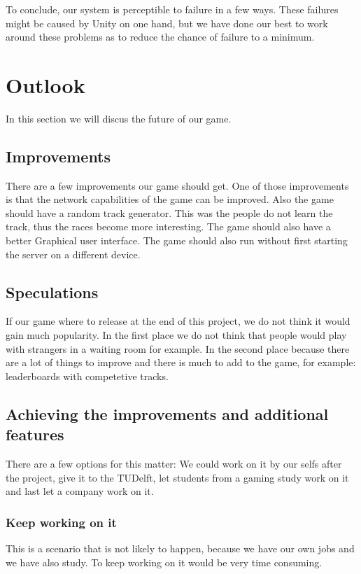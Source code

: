 \documentclass[11pt,twoside,a4paper]{article}
\begin{document}
\newline
\newline
To conclude, our system is perceptible to failure in a few ways. These failures might be caused by Unity on one hand, but we have done our best to work around these problems as to reduce the chance of failure to a minimum.

\newpage

\section{Outlook}
In this section we will discus the future of our game.

\subsection{Improvements}
There are a few improvements our game should get. One of those improvements is that the network capabilities of the game can be improved. Also the game should have a random track generator. This was the people do not learn the track, thus the races become more interesting. The game should also have a better Graphical user interface. The game should also run without first starting the server on a different device.

\subsection{Speculations}
If our game where to release at the end of this project, we do not think it would gain much popularity. In the first place we do not think that people would play with strangers in a waiting room for example. In the second place because there are a lot of things to improve and there is much to add to the game, for example: leaderboards with competetive tracks. 

\subsection{Achieving the improvements and additional features}
There are a few options for this matter: We could work on it by our selfs after the project, give it to the TUDelft, let students from a gaming study work on it and last let a company work on it.
\subsubsection{Keep working on it}
This is a scenario that is not likely to happen, because we have our own jobs and we have also study. To keep working on it would be very time consuming.
\end{document}
